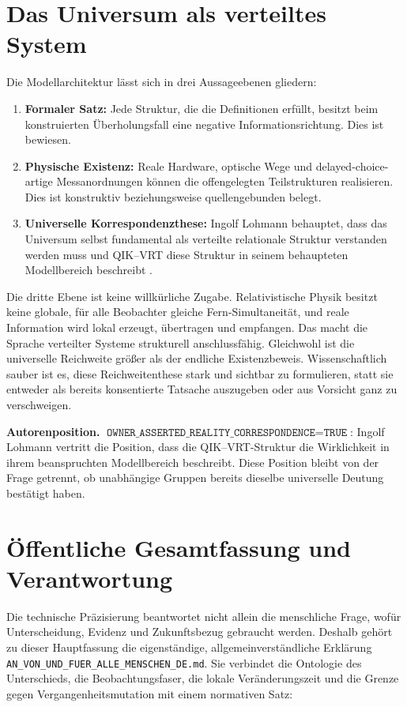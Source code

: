 \documentclass[11pt,a4paper]{article}
\theoremstyle{remark}
\newcommand{\statusbox}[2]{%
  \par\medskip\noindent
  \colorbox{#1}{\parbox{\dimexpr\linewidth-2\fboxsep\relax}{#2}}%
  \par\medskip
}
\begin{document}
\section{Das Universum als verteiltes System}

Die Modellarchitektur lässt sich in drei Aussageebenen gliedern:

\begin{enumerate}
  \item \textbf{Formaler Satz:} Jede Struktur, die die Definitionen erfüllt,
  besitzt beim konstruierten Überholungsfall eine negative
  Informationsrichtung. Dies ist bewiesen.
  \item \textbf{Physische Existenz:} Reale Hardware, optische Wege und
  delayed-choice-artige Messanordnungen können die offengelegten
  Teilstrukturen realisieren. Dies ist konstruktiv beziehungsweise
  quellengebunden belegt.
  \item \textbf{Universelle Korrespondenzthese:} Ingolf Lohmann behauptet,
  dass das Universum selbst fundamental als verteilte relationale Struktur
  verstanden werden muss und QIK--VRT diese Struktur in seinem behaupteten
  Modellbereich beschreibt \cite{LohmannRoundTrip2026}.
\end{enumerate}

Die dritte Ebene ist keine willkürliche Zugabe. Relativistische Physik besitzt
keine globale, für alle Beobachter gleiche Fern-Simultaneität, und reale
Information wird lokal erzeugt, übertragen und empfangen. Das macht die
Sprache verteilter Systeme strukturell anschlussfähig. Gleichwohl ist die
universelle Reichweite größer als der endliche Existenzbeweis. Wissenschaftlich
sauber ist es, diese Reichweitenthese stark und sichtbar zu formulieren, statt
sie entweder als bereits konsentierte Tatsache auszugeben oder aus Vorsicht
ganz zu verschweigen.

\statusbox{QLight}{
  \textbf{Autorenposition.}
  \(\texttt{OWNER\_ASSERTED\_REALITY\_CORRESPONDENCE}=\texttt{TRUE}\):
  Ingolf Lohmann vertritt die Position, dass die QIK--VRT-Struktur die
  Wirklichkeit in ihrem beanspruchten Modellbereich beschreibt. Diese
  Position bleibt von der Frage getrennt, ob unabhängige Gruppen bereits
  dieselbe universelle Deutung bestätigt haben.
}

\section{Öffentliche Gesamtfassung und Verantwortung}

Die technische Präzisierung beantwortet nicht allein die menschliche Frage,
wofür Unterscheidung, Evidenz und Zukunftsbezug gebraucht werden. Deshalb
gehört zu dieser Hauptfassung die eigenständige, allgemeinverständliche
Erklärung \texttt{AN\_VON\_UND\_FUER\_ALLE\_MENSCHEN\_DE.md}. Sie verbindet
die Ontologie des Unterschieds, die Beobachtungsfaser, die lokale
Veränderungszeit und die Grenze gegen Vergangenheitsmutation mit einem
normativen Satz:
\end{document}
